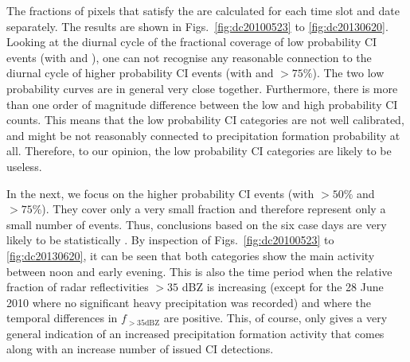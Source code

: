 The fractions of pixels that satisfy the  are calculated for each time slot and date separately. The results are shown in Figs.~\ref{fig:dc20100523} to \ref{fig:dc20130620}. Looking at the diurnal cycle of the fractional coverage of low probability CI events (with \annote[JMM]{$>0\%$}{Do you mean $]0,25]\%$?} and \annote[JMM]{$>25\%$}{Do you mean $]25,50]\%$?}), one can not recognise any reasonable connection to the diurnal cycle of higher probability CI events (with \annote[JMM]{$>50\%$}{Do you mean $]50,75]\%$?} and $>75\%$). The two low probability curves are in general very close together. Furthermore, there is more than one order of magnitude difference between the low and high probability CI counts. This means that the low probability CI categories are not well calibrated, and might be not reasonably connected to precipitation formation probability at all. Therefore, to our opinion, the low probability CI categories are likely to be useless.

In the next, we focus on the higher probability CI events (with $>50\%$ and $>75\%$). They cover only a very small fraction and therefore represent only a small number of events. Thus, conclusions based on the six case days are very likely to be statistically . By inspection 
of Figs.~\ref{fig:dc20100523} to \ref{fig:dc20130620}, it can be seen that both categories show the main activity between noon and early evening. This is also the time period when the relative fraction of radar reflectivities $>35$ dBZ is increasing (except for the 28 June 2010 where no significant heavy precipitation was recorded) and where the temporal differences in $f_{>35\mathrm{dBZ}}$ are positive. This, of course, only gives a very general indication of an increased precipitation formation activity that comes along with an increase number of issued CI detections.

